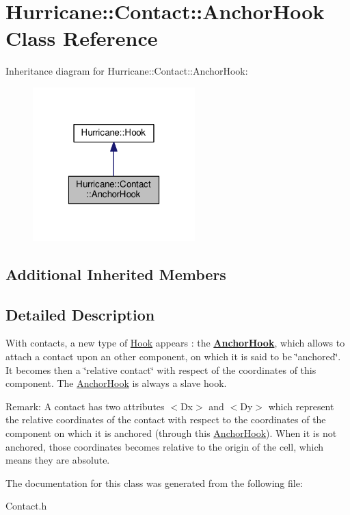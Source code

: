 \hypertarget{classHurricane_1_1Contact_1_1AnchorHook}{\section{Hurricane\-:\-:Contact\-:\-:Anchor\-Hook Class Reference}
\label{classHurricane_1_1Contact_1_1AnchorHook}
}


Inheritance diagram for Hurricane\-:\-:Contact\-:\-:Anchor\-Hook\-:\nopagebreak
\begin{figure}[H]
\begin{center}
\leavevmode
\includegraphics[width=178pt]{classHurricane_1_1Contact_1_1AnchorHook__inherit__graph}
\end{center}
\end{figure}
\subsection*{Additional Inherited Members}


\subsection{Detailed Description}
With contacts, a new type of \hyperlink{classHurricane_1_1Hook}{Hook} appears \-: the {\bfseries \hyperlink{classHurricane_1_1Contact_1_1AnchorHook}{Anchor\-Hook}}, which allows to attach a contact upon an other component, on which it is said to be \char`\"{}anchored\char`\"{}. It becomes then a \char`\"{}relative contact\char`\"{} with respect of the coordinates of this component. The \hyperlink{classHurricane_1_1Contact_1_1AnchorHook}{Anchor\-Hook} is always a slave hook.

\begin{DoxyParagraph}{Remark\-:}
A contact has two attributes {\ttfamily $<$Dx$>$} and {\ttfamily $<$Dy$>$} which represent the relative coordinates of the contact with respect to the coordinates of the component on which it is anchored (through this \hyperlink{classHurricane_1_1Contact_1_1AnchorHook}{Anchor\-Hook}). When it is not anchored, those coordinates becomes relative to the origin of the cell, which means they are absolute. 
\end{DoxyParagraph}


The documentation for this class was generated from the following file\-:\begin{DoxyCompactItemize}
\item 
Contact.\-h\end{DoxyCompactItemize}
